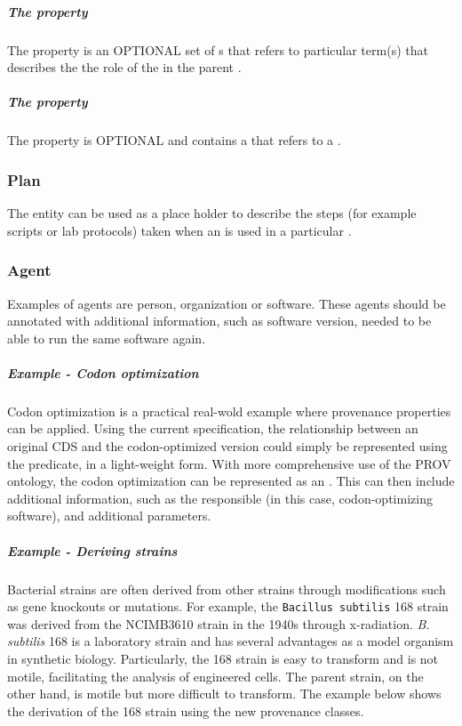 \subparagraph{The  property}\label{sec:roles:A}
The  property is an OPTIONAL set of s that refers to particular term(s) that describes the the role of the  in the parent . 

\subparagraph{The  property}\label{sec:plan}
The  property is OPTIONAL and contains a  that refers to a .

\subsubsection{Plan}
\label{sec:prov:Plan}

 The  entity can be used as a place holder to describe the steps (for example scripts or lab protocols) taken when an  is used in a particular . 

\subsubsection{Agent}
\label{sec:prov:Agent}

 Examples of agents are person, organization or software. These agents should be annotated with additional information, such as software version, needed to be able to run the same software again.

\subparagraph{Example - Codon optimization}

 Codon optimization is a practical real-wold example where provenance properties can be applied. Using the current specification, the relationship between an original CDS and the codon-optimized version could simply be represented using the  predicate, in a light-weight form. With more comprehensive use of the PROV ontology, the codon optimization can be represented as an . This  can then include additional information, such as the  responsible (in this case, codon-optimizing software), and additional parameters.

\subparagraph{Example - Deriving strains}

Bacterial strains are often derived from other strains through modifications such as gene knockouts or mutations. For example, the \texttt{Bacillus subtilis} 168 strain was derived from the NCIMB3610 strain in the 1940s through x-radiation. \textit{B. subtilis} 168 is a laboratory strain and has several advantages as a model organism in synthetic biology. Particularly, the 168 strain is easy to transform and is not motile, facilitating the analysis of engineered cells. The parent strain, on the other hand, is motile but more difficult to transform. The example below shows the derivation of the 168 strain using the new provenance classes.

